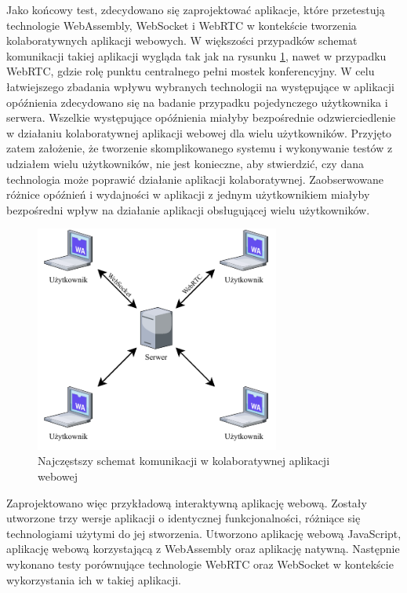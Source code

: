 \documentclass[language=polish,type=master]{aghmodern}
\begin{document}
Jako końcowy test, zdecydowano się zaprojektować aplikacje, które przetestują technologie WebAssembly, WebSocket i WebRTC w kontekście tworzenia kolaboratywnych aplikacji webowych.
W większości przypadków schemat komunikacji takiej aplikacji wygląda tak jak na rysunku \ref{fig:collaboration}, nawet w przypadku WebRTC, gdzie rolę punktu centralnego pełni mostek konferencyjny.
W celu łatwiejszego zbadania wpływu wybranych technologii na występujące w aplikacji opóźnienia zdecydowano się na badanie przypadku pojedynczego użytkownika i serwera.
Wszelkie występujące opóźnienia miałyby bezpośrednie odzwierciedlenie w działaniu kolaboratywnej aplikacji webowej dla wielu użytkowników.
Przyjęto zatem założenie, że tworzenie skomplikowanego systemu i wykonywanie testów z udziałem wielu użytkowników, nie jest konieczne, aby stwierdzić, czy dana technologia może poprawić działanie aplikacji kolaboratywnej.
Zaobserwowane różnice opóźnień i wydajności w aplikacji z jednym użytkownikiem miałyby bezpośredni wpływ na działanie aplikacji obsługującej wielu użytkowników.

\begin{figure}[H]
    \centering
    \vspace*{15pt}
    \includegraphics[width=0.717\textwidth]{images/collaboration.pdf} %
    \caption{Najczęstszy schemat komunikacji w kolaboratywnej aplikacji webowej}
    \label{fig:collaboration}
\end{figure}

Zaprojektowano więc przykładową interaktywną aplikację webową.
Zostały utworzone trzy wersje aplikacji o identycznej funkcjonalności, różniące się technologiami użytymi do jej stworzenia.
Utworzono aplikację webową JavaScript, aplikację webową korzystającą z WebAssembly oraz aplikację natywną.
Następnie wykonano testy porównujące technologie WebRTC oraz WebSocket w kontekście wykorzystania ich w takiej aplikacji.
\end{document}
